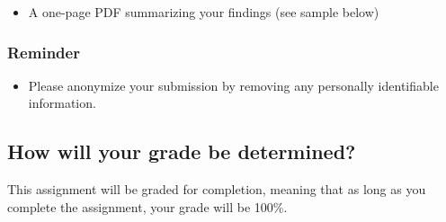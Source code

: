 \documentclass{article}
\begin{document}
        \begin{itemize}
          \item A one-page PDF summarizing your findings (see sample below)
        \end{itemize}

      \subsubsection*{\sc Reminder}

        \begin{itemize}
          \item Please anonymize your submission by removing any personally identifiable information.
        \end{itemize}

    \subsection*{\sc How will your grade be determined?}

      This assignment will be graded for completion, meaning that as long as you complete the assignment, your grade will be 100\%.
\end{document}
